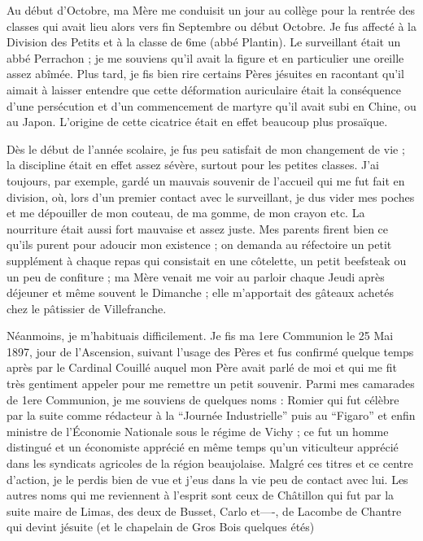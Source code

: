 \documentclass[11pt,a4paper]{report}
\begin{document}
Au début d'Octobre, ma Mère me conduisit un jour au collège pour la rentrée des classes qui avait lieu alors vers fin Septembre ou début Octobre. Je fus affecté à la Division des Petits et à la classe de 6me (abbé Plantin). Le surveillant était un abbé Perrachon ; je me souviens qu'il avait la figure et en particulier une oreille assez abîmée. Plus tard, je fis bien rire certains Pères jésuites en racontant qu'il aimait à laisser entendre que cette déformation auriculaire était la conséquence d'une persécution et d'un commencement de martyre qu'il avait subi en Chine, ou au Japon. L'origine de cette cicatrice était en effet beaucoup plus prosaïque.

Dès le début de l'année scolaire, je fus peu satisfait de mon changement de vie ; la discipline était en effet assez sévère, surtout pour les petites classes. J'ai toujours, par exemple, gardé un mauvais souvenir de l'accueil qui me fut fait en division, où, lors d'un premier contact avec le surveillant, je dus vider mes poches et me dépouiller de mon couteau, de ma gomme, de mon crayon etc. La nourriture était aussi fort mauvaise et assez juste. Mes parents firent bien ce qu'ils purent pour adoucir mon existence ; on demanda au réfectoire un petit supplément à chaque repas qui consistait en une côtelette, un petit beefsteak ou un peu de confiture ; ma Mère venait me voir au parloir chaque Jeudi après déjeuner et même souvent le Dimanche ; elle m'apportait des gâteaux achetés chez le pâtissier de Villefranche.

Néanmoins, je m'habituais difficilement. Je fis ma 1ere Communion le 25 Mai 1897, jour de l'Ascension, suivant l'usage des Pères et fus confirmé quelque temps après par le Cardinal Couillé auquel mon Père avait parlé de moi et qui me fit très gentiment appeler pour me remettre un petit souvenir. Parmi mes camarades de 1ere Communion, je me souviens de quelques noms : Romier qui fut célèbre par la suite comme rédacteur à la ``Journée Industrielle'' puis au ``Figaro'' et enfin ministre de l'Économie Nationale sous le régime de Vichy ; ce fut un homme distingué et un économiste apprécié en même temps qu'un viticulteur apprécié dans les syndicats agricoles de la région beaujolaise. Malgré ces titres et ce centre d'action, je le perdis bien de vue et j'eus dans la vie peu de contact avec lui. Les autres noms qui me reviennent à l'esprit sont ceux de Châtillon qui fut par la suite maire de Limas, des deux de Busset, Carlo et----, de Lacombe de Chantre qui devint jésuite (et le chapelain de Gros Bois quelques étés)
\end{document}
